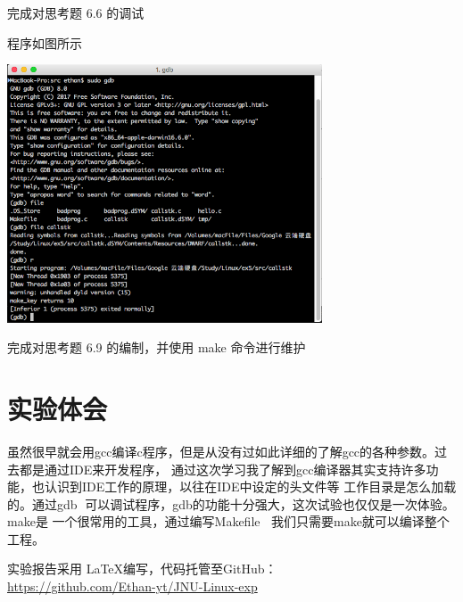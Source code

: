 \documentclass{JNUexp}
\begin{document}
\begin{problem}
    完成对思考题 6.6 的调试
\end{problem}

\begin{answer}
    程序如图所示
    
\end{answer}

\begin{image}
    \includegraphics[width=0.7\textwidth]{5}
\end{image}

\begin{problem}
    完成对思考题 6.9 的编制，并使用 make 命令进行维护
\end{problem}

\begin{answer}
    Makefile如图所示
    make},title=Makefile]{../src/Makefile}
\end{answer}

\newpage
\section{实验体会}
虽然很早就会用gcc编译c程序，但是从没有过如此详细的了解gcc的各种参数。过去都是通过IDE来开发程序，
通过这次学习我了解到gcc编译器其实支持许多功能，也认识到IDE工作的原理，以往在IDE中设定的头文件等
工作目录是怎么加载的。通过gdb 可以调试程序，gdb的功能十分强大，这次试验也仅仅是一次体验。make是
一个很常用的工具，通过编写Makefile ，我们只需要make就可以编译整个工程。

\vfill

实验报告采用 \LaTeX 编写，代码托管至GitHub：\\
\url{https://github.com/Ethan-yt/JNU-Linux-exp}
\end{document}

